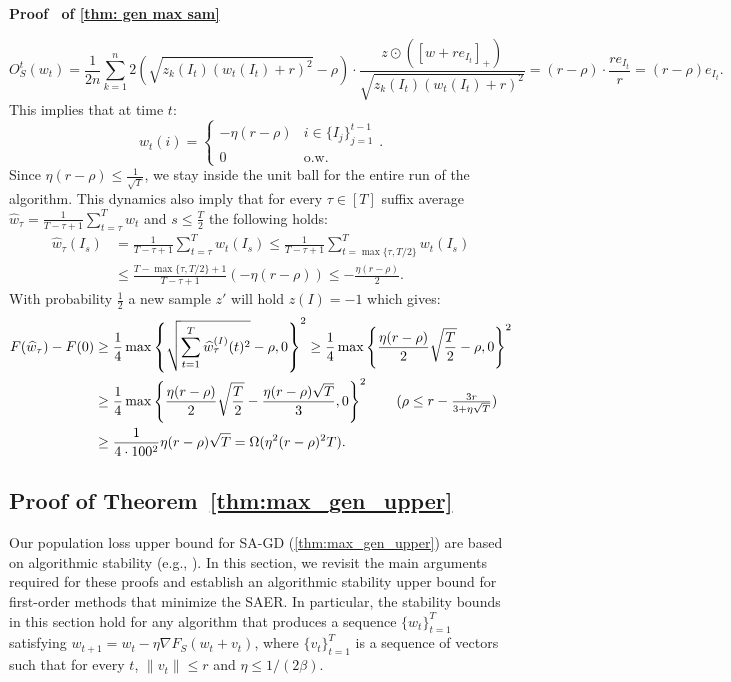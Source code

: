 \documentclass[11pt]{article}
\newcommand{\rad}{r}
\renewenvironment{proof}[1][]{%
  \par\noindent\textbf{\upshape Proof%
  \if\relax\detokenize{#1}\relax\else\ #1\fi}\ %
}{\jmlrQED}
\begin{document}
\begin{proof}[of \cref{thm: gen max sam}]
$$\textstyle
O_S^t(w_t) = \frac{1}{2n} \sum_{k=1}^n 2\left(\sqrt{z_k(I_t)(w_t(I_t) + \rad)^2}  - \rho \right)\cdot \frac{z \odot ([w + \rad e_{I_t}]_+)}{\sqrt{z_k(I_t)(w_t(I_t) + \rad)^2}}  = (\rad - \rho) \cdot \frac{\rad e_{I_t}}{\rad} = (\rad - \rho)e_{I_t}.$$
This implies that at time $t$: 
$$w_t(i) = \begin{cases}
    -\eta(\rad - \rho) & i \in \{I_j\}_{j=1}^{t-1} \\
    0 & \text{o.w.}
\end{cases}.$$
Since $\eta (\rad - \rho) \leq \frac{1}{\sqrt{T}}$, we stay inside the unit ball for the entire run of the algorithm. This dynamics also imply that for every $\tau\in[T]$ suffix average $\widehat{w}_{\tau} = \frac{1}{T-\tau+1}\sum_{t = \tau}^T w_t$ and $s \leq \frac{T}{2}$ the following holds: 
\begin{align*}
    \widehat{w}_{\tau}(I_s) & = \frac{1}{T-\tau+1}\sum_{t = \tau}^T w_t(I_s) \leq \frac{1}{T-\tau+1}\sum_{t = \max\{\tau, T/2\}}^T w_t(I_s) \\
    & \leq \frac{T - \max\{\tau, T/2\} +1}{T - \tau + 1} \left(-\eta (\rad - \rho) \right) \leq - \frac{\eta (\rad - \rho)}{2}.
\end{align*}
With probability $\frac{1}{2}$ a new sample $z'$ will hold $z(I) = -1$ which gives:
\begin{align*}
    F(\widehat{w}_{\tau}) - F(0) & \geq \frac{1}{4} \max \left\{\sqrt{\sum_{t=1}^T \widehat{w}_{\tau}^{(I)}(t)^2 } - \rho,0 \right\}^2 \geq \frac{1}{4} \max\left\{ \frac{\eta(\rad - \rho)}{2} \sqrt{\frac{T}{2}}  - \rho,0 \right\}^2 \\
    & \geq  \frac{1}{4} \max\left\{ \frac{\eta(\rad - \rho)}{2} \sqrt{\frac{T}{2}}  - \frac{\eta (\rad - \rho) \sqrt{T}}{3},0 \right\}^2  \tag{$\rho \leq \rad - \frac{3\rad}{3+\eta \sqrt{T}}$} \\
    & \geq \frac{1}{4\cdot 100^2}\eta(\rad - \rho) \sqrt{T} = \Omega(\eta^2 (\rad - \rho)^2 T).
\end{align*}
    
\end{proof}


\subsection{Proof of Theorem~\ref{thm:max_gen_upper}}\label{sec:proof_max_gen_upper}
Our population loss upper bound for SA-GD (\cref{thm:max_gen_upper}) are based on algorithmic stability 
(e.g., \cite{bousquet2002stability,hardt2016train}). 
In this section, we revisit the main arguments required for these proofs and establish an algorithmic stability upper bound for first-order methods that minimize the SAER. 
In particular, the stability bounds in this section hold for any algorithm that produces a sequence $\{w_t\}_{t=1}^T$ satisfying $w_{t+1} = w_t - \eta \nabla F_S(w_t + v_t)$, where $\{v_t\}_{t=1}^T$ is a sequence of vectors such that for every $t$, $\|v_t\| \leq \rad$ and $\eta \leq 1/(2\beta)$.
\end{document}
